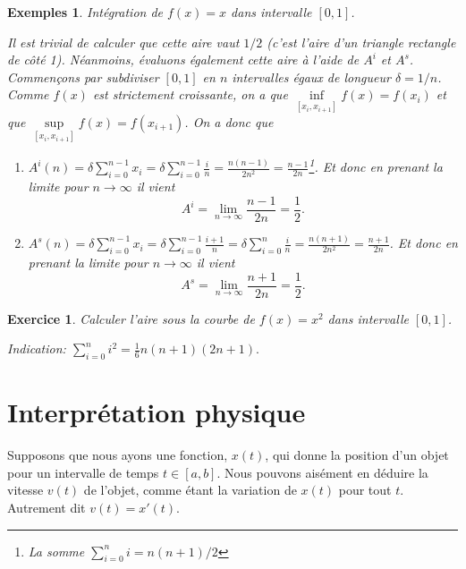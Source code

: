 \documentclass[a4paper,12pt]{book}
\newtheorem*{exemples}{Exemples}
\newtheorem*{exercice}{Exercice}
\begin{document}
\begin{exemples}Intégration de $f(x)=x$ dans intervalle $[0,1]$.

Il est trivial de calculer 
que cette aire vaut $1/2$ (c'est l'aire d'un triangle rectangle de côté 1). Néanmoins, évaluons également cette aire à l'aide de $A^i$ et $A^s$. Commençons par subdiviser $[0,1]$ en $n$ intervalles égaux de longueur 
$\delta=1/n$. Comme $f(x)$ est strictement croissante, on a que 
$\inf\limits_{[x_i,x_{i+1}]}f(x)=f(x_i)$ et que $\sup\limits_{[x_i,x_{i+1}]}f(x)=f(x_{i+1})$. On a donc que
\begin{enumerate}
\item $A^i(n)=\delta\sum_{i=0}^{n-1} x_i=\delta\sum_{i=0}^{n-1}\frac{i}{n}=\frac{n(n-1)}{2n^2}=\frac{n-1}{2n}$\footnote{
La somme $\sum_{i=0}^n i=n(n+1)/2$}. Et donc en prenant la limite pour $n\rightarrow\infty$ il vient
\begin{equation}
A^i=\lim\limits_{n\rightarrow\infty}\frac{n-1}{2n}=\frac{1}{2}.
\end{equation}

\item $A^s(n)=\delta\sum_{i=0}^{n-1} x_i=\delta\sum_{i=0}^{n-1}\frac{i+1}{n}=\delta\sum_{i=0}^{n}\frac{i}{n}=\frac{n(n+1)}{2n^2}=\frac{n+1}{2n}$. Et donc en prenant la limite pour $n\rightarrow\infty$ il vient
\begin{equation}
A^s=\lim\limits_{n\rightarrow\infty}\frac{n+1}{2n}=\frac{1}{2}.
\end{equation}

\end{enumerate}

\end{exemples}

\begin{exercice}
Calculer l'aire sous la courbe de $f(x)=x^2$ dans intervalle $[0,1]$.

Indication: $\sum_{i=0}^n i^2=\frac{1}{6}n(n+1)(2n+1).$
\end{exercice}

\section{Interprétation physique}

Supposons que nous ayons une fonction, $x(t)$, qui donne la position d'un objet pour un intervalle 
de temps $t\in[a,b]$. Nous pouvons aisément en déduire la vitesse $v(t)$ de l'objet, comme étant la variation
de $x(t)$ pour tout $t$. Autrement dit $v(t)=x'(t)$.
\end{document}
